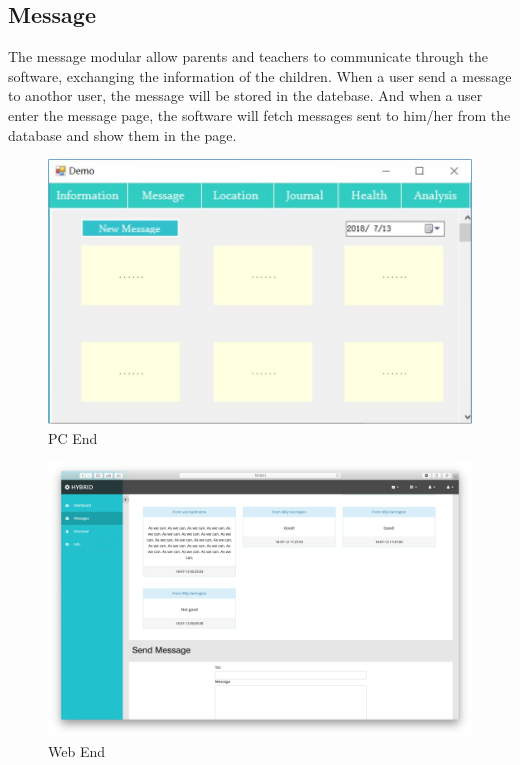 \documentclass{article}
\begin{document}
\subsection{Message}
The message modular allow parents and teachers to communicate through the software, exchanging the information of the children. When a user send a message to anothor user, the message will be stored in the datebase. And when a user enter the message page, the software will fetch messages sent to him/her from the database and show them in the page.
	\begin{figure}[H]
 	 \centering
 		\includegraphics[width=0.8\linewidth]{img/message1.png}
 		\caption{PC End}
 	\end{figure}
 	\begin{figure}[H]
 	 \centering
 		\includegraphics[width=\linewidth]{img/message2.png}
 		\caption{Web End}
 	\end{figure}
\end{document}
